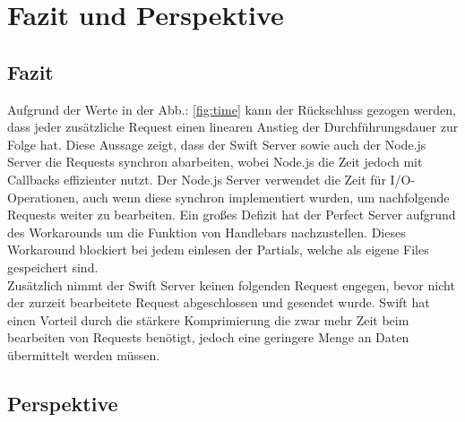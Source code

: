 \chapter{Fazit und Perspektive}\label{chap:conclusion}
\chapterstart

\section{Fazit}

Aufgrund der Werte in der Abb.: \ref{fig:time} kann der Rückschluss gezogen werden, dass jeder zusätzliche Request einen linearen Anstieg der Durchführungsdauer zur Folge hat. Diese Aussage zeigt, dass der Swift Server sowie auch der Node.js Server die Requests synchron abarbeiten, wobei Node.js die Zeit jedoch mit Callbacks effizienter nutzt. Der Node.js Server verwendet die Zeit für I/O-Operationen, auch wenn diese synchron implementiert wurden, um nachfolgende Requests weiter zu bearbeiten. Ein großes Defizit hat der Perfect Server aufgrund des Workarounds um die Funktion von Handlebars nachzustellen. Dieses Workaround blockiert bei jedem einlesen der Partials, welche als eigene Files gespeichert sind.\\
Zusätzlich nimmt der Swift Server keinen folgenden Request engegen, bevor nicht der zurzeit bearbeitete Request abgeschlossen und gesendet wurde. Swift hat einen Vorteil durch die stärkere Komprimierung die zwar mehr Zeit beim bearbeiten von Requests benötigt, jedoch eine geringere Menge an Daten übermittelt werden müssen.

\section{Perspektive}

\chapterend
